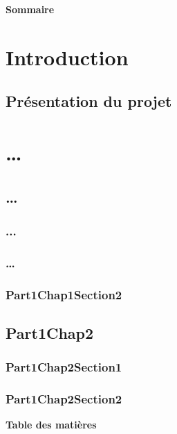 \documentclass[french,a4paper]{book}
\begin{document}
\frontmatter
\pagestyle{front}



\begin{center}%
    \bfseries\LARGE Sommaire
\end{center}

\mainmatter
\pagestyle{plain}
\part{Introduction}
\chapter{Présentation du projet}



\part{\dots}
\chapter{\dots}
\renewcommand{\currentSectionTitle}{path to the next file}
\section{...}
% 

\clearpage
\renewcommand{\currentSectionTitle}{path to the next file}
\section{\dots}
%

\clearpage
\renewcommand{\currentSectionTitle}{Part1Chap1Section2}
\section{Part1Chap1Section2}

\clearpage
\chapter{Part1Chap2}

\section{Part1Chap2Section1}

\section{Part1Chap2Section2}

\backmatter
\pagestyle{empty}
\begin{center}%
    \bfseries\LARGE Table des matières
\end{center}
\tableofcontents
\end{document}
